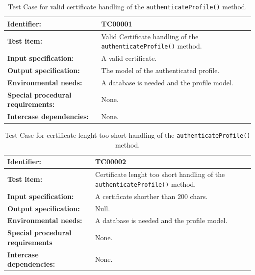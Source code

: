 \begin{table}[htbp]
	\centering
		\begin{tabular}{| p{4.5cm} | m{9cm} |}
			\hline
			\textbf{Identifier:} 					& TC00001 \\ \hline
			\textbf{Test item:}						& Valid Certificate handling of the \texttt{authenticateProfile()} method. \\ \hline
			\textbf{Input specification:}			& A valid certificate. \\ \hline
			\textbf{Output specification:} 			& The model of the authenticated profile. \\ \hline
			\textbf{Environmental needs:}			& A database is needed and the profile model. \\ \hline
			\textbf{Special procedural requirements:}	& None. \\ \hline
			\textbf{Intercase dependencies:}			& None. \\ \hline
		\end{tabular}
	\caption{Test Case for valid certificate handling of the \texttt{authenticateProfile()} method.}
	\label{tab:TestCase_ValidCertificateHandling}
\end{table}

\begin{table}[htbp]
	\centering
		\begin{tabular}{| p{4.5cm} | m{9cm} |}
			\hline
			\textbf{Identifier:} 					& TC00002 \\ \hline
			\textbf{Test item:}						& Certificate lenght too short handling of the \texttt{authenticateProfile()} method. \\ \hline
			\textbf{Input specification:}			& A certificate shorther than 200 chars. \\ \hline
			\textbf{Output specification:} 			& Null. \\ \hline
			\textbf{Environmental needs:}			& A database is needed and the profile model. \\ \hline
			\textbf{Special procedural requirements}	& None. \\ \hline
			\textbf{Intercase dependencies:}			& None. \\ \hline
		\end{tabular}
	\caption{Test Case for certificate lenght too short handling of the \texttt{authenticateProfile()} method.}
	\label{tab:TestCase_CertificateToShortHandling}
\end{table}

